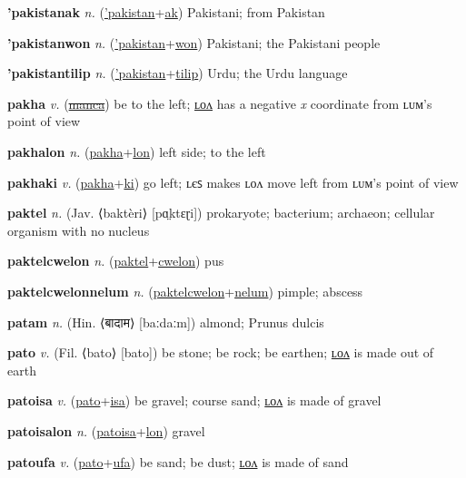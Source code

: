 \textbf{\hypertarget{'pakistanak}{'pakistanak}} \textit{n.} (\hyperlink{'pakistan}{'pakistan}+\allowbreak \hyperlink{ak}{ak})
Pakistani; from Pakistan

\textbf{\hypertarget{'pakistanwon}{'pakistanwon}} \textit{n.} (\hyperlink{'pakistan}{'pakistan}+\allowbreak \hyperlink{won}{won})
Pakistani; the Pakistani people

\textbf{\hypertarget{'pakistantilip}{'pakistantilip}} \textit{n.} (\hyperlink{'pakistan}{'pakistan}+\allowbreak \hyperlink{tilip}{tilip})
Urdu; the Urdu language

\textbf{\hypertarget{pakha}{pakha}} \textit{v.} (\hyperlink{manca}{\sout{manca}})
be to the left; \hyperlink{pakhalon}{ʟᴏᴧ} has a negative \textit{x} coordinate from ʟᴜᴍ’s point of view

\textbf{\hypertarget{pakhalon}{pakhalon}} \textit{n.} (\hyperlink{pakha}{pakha}+\allowbreak \hyperlink{lon}{lon})
left side; to the left

\textbf{\hypertarget{pakhaki}{pakhaki}} \textit{v.} (\hyperlink{pakha}{pakha}+\allowbreak \hyperlink{ki}{ki})
go left; ʟєꜱ makes ʟᴏᴧ move left from ʟᴜᴍ’s point of view

\textbf{\hypertarget{paktel}{paktel}} \textit{n.} (Jav. ⟨baktèri⟩ [pɑ̤ktɛɽi])
prokaryote; bacterium; archaeon; cellular organism with no nucleus

\textbf{\hypertarget{paktelcwelon}{paktelcwelon}} \textit{n.} (\hyperlink{paktel}{paktel}+\allowbreak \hyperlink{cwelon}{cwelon})
pus

\textbf{\hypertarget{paktelcwelonnelum}{paktelcwelonnelum}} \textit{n.} (\hyperlink{paktelcwelon}{paktelcwelon}+\allowbreak \hyperlink{nelum}{nelum})
pimple; abscess

\textbf{\hypertarget{patam}{patam}} \textit{n.} (Hin. ⟨{\devanagari{}बादाम}⟩ [baːdaːm])
almond; Prunus dulcis

\textbf{\hypertarget{pato}{pato}} \textit{v.} (Fil. ⟨bato⟩ [bato])
be stone; be rock; be earthen; \hyperlink{patolon}{ʟᴏᴧ} is made out of earth

\textbf{\hypertarget{patoisa}{patoisa}} \textit{v.} (\hyperlink{pato}{pato}+\allowbreak \hyperlink{isa}{isa})
be gravel; course sand; \hyperlink{patoisalon}{ʟᴏᴧ} is made of gravel

\textbf{\hypertarget{patoisalon}{patoisalon}} \textit{n.} (\hyperlink{patoisa}{patoisa}+\allowbreak \hyperlink{lon}{lon})
gravel

\textbf{\hypertarget{patoufa}{patoufa}} \textit{v.} (\hyperlink{pato}{pato}+\allowbreak \hyperlink{ufa}{ufa})
be sand; be dust; \hyperlink{patoufalon}{ʟᴏᴧ} is made of sand

